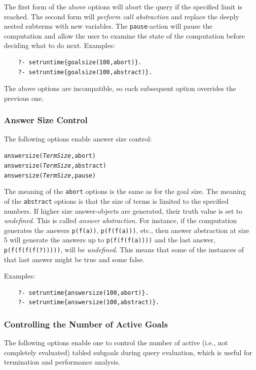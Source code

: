 \documentclass[11pt]{article}
\begin{document}
The first form of the above options
will abort the
query if the specified limit is reached.
The second form will \emph{perform call abstraction} and replace the
deeply nested subterms with new variables. The \texttt{pause}-action will
pause the computation and allow the user to examine the state of the
computation before deciding what to do next.  Examples:
\begin{verbatim}
    ?- setruntime{goalsize(100,abort)}.
    ?- setruntime{goalsize(100,abstract)}.
\end{verbatim}
The above options are incompatible, so each subsequent option overrides the
previous one.


\subsubsection{Answer Size Control}

The following options enable answer size control:
\begin{alltt}
    answersize(\emph{TermSize},abort)
    answersize(\emph{TermSize},abstract)
    answersize(\emph{TermSize},pause)
\end{alltt}
The meaning of the \texttt{abort} options is the same as
for the goal size.
The meaning of the \texttt{abstract} options is that the size of
terms is limited to the specified numbers. If higher size
answer-objects are generated, their truth value is set to \emph{undefined}. 
This is called \emph{answer abstraction}.  For instance, if the computation
generates the answers \texttt{p(f(a))}, \texttt{p(f(f(a)))}, etc., then
answer abstraction at  size 5 will generate the answers up to
\texttt{p(f(f(f(a))))} and the last answer, \texttt{p(f(f(f(f(?)))))}, will
be \emph{undefined}. This means that some of the instances of that last
answer might be true and some false.

Examples:
\begin{verbatim}
    ?- setruntime{answersize(100,abort)}.
    ?- setruntime{answersize(100,abstract)}.
\end{verbatim}

\subsubsection{Controlling the Number of Active Goals}

The following options enable one to control the number of active (i.e., not
completely evaluated) tabled subgoals during query evaluation, which is
useful for termination and performance analysis.
\end{document}
